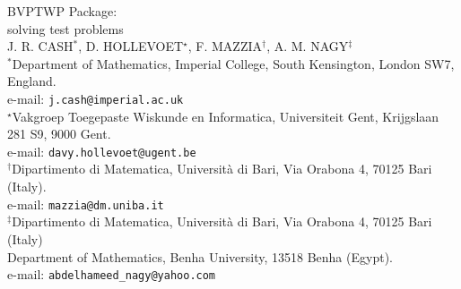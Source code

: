 \documentclass[<options>]{article}
\begin{document}
\vspace*{1cm}

\begin{center}
{\Huge BVPTWP Package:\\ solving test problems}\\[5mm]
{\Large J. R. CASH$^{\ast}$, D. HOLLEVOET$^{\star}$, F. MAZZIA$^{\dag}$,  A. M. NAGY$^{\ddagger}$}\\
[5mm]
{\Large $^{\ast}$\small Department of Mathematics,
Imperial College, South Kensington, London SW7, England.}\\ e-mail: \texttt{j.cash@imperial.ac.uk}\\[5mm]
{\Large $^{\star}$\small Vakgroep Toegepaste Wiskunde en Informatica, Universiteit Gent, Krijgslaan 281 S9, 9000 Gent.}\\
e-mail:
\texttt{davy.hollevoet@ugent.be}\\[5mm]
{\Large $^{\dag}$\small Dipartimento di Matematica, Universit\`a di Bari, Via Orabona 4, 70125 Bari (Italy).}\\
e-mail:
\texttt{mazzia@dm.uniba.it}\\[5mm]
{\Large $^{\ddagger}$\small Dipartimento di Matematica, Universit\`a di Bari, Via Orabona 4, 70125 Bari (Italy)\\ Department of Mathematics, Benha University, 13518 Benha (Egypt). } \\
e-mail: \texttt{abdelhameed\_nagy@yahoo.com}\\
\end{center}


\newpage
\end{document}
